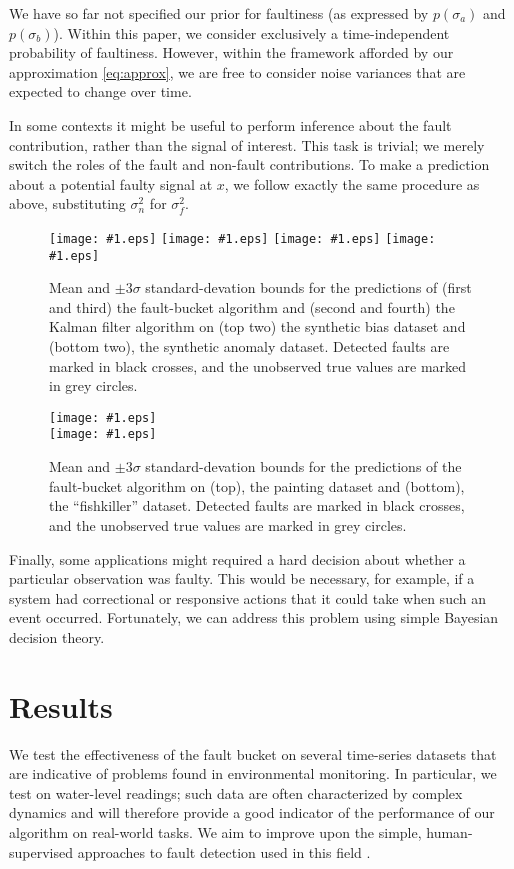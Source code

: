 \documentclass{article}
\newcommand{\psff}[1]{\texttt{[image: \#1.eps]}}
\begin{document}
We have so far not specified our prior for faultiness (as expressed by
$p(\sigma_a)$ and $p(\sigma_b)$). Within this paper, we consider
exclusively a time-independent probability of faultiness. However,
within the framework afforded by our approximation \eqref{eq:approx},
we are free to consider noise variances that are expected to change
over time.

In some contexts it might be useful to perform inference about the
fault contribution, rather than the signal of interest.  This task is
trivial; we merely switch the roles of the fault and non-fault
contributions.  To make a prediction about a potential faulty signal
at $x$, we follow exactly the same procedure as above, substituting
$\sigma_n^2$ for $\sigma_f^2$.

\begin{figure*}
  \centering
  \small
  \psff{bias}
  \psff{kf_bias}
  \vspace*{2\baselineskip}
  \psff{dynamics}
  \psff{kf_dynamics}
  \caption{Mean and $\pm3\sigma$ standard-devation bounds for the
    predictions of (first and third) the fault-bucket algorithm and
    (second and fourth) the Kalman filter algorithm on (top two) the
    synthetic bias dataset and (bottom two), the synthetic anomaly
    dataset.  Detected faults are marked in black crosses, and the
    unobserved true values are marked in grey circles.}
  \label{compare}
\end{figure*}

\begin{figure*}
  \centering
  \small
  \psff{painting} \\
  \vspace{\baselineskip}
  \psff{fishkiller}
  \caption{Mean and $\pm3\sigma$ standard-devation bounds for the
    predictions of the fault-bucket algorithm on (top), the painting
    dataset and (bottom), the ``fishkiller'' dataset.  Detected faults are
    marked in black crosses, and the unobserved true values are marked
    in grey circles.}
  \label{justfb}
\end{figure*}

Finally, some applications might required a hard decision about
whether a particular observation was faulty.  This would be necessary,
for example, if a system had correctional or responsive actions that
it could take when such an event occurred.  Fortunately, we can
address this problem using simple Bayesian decision theory.

\section{Results}
We test the effectiveness of the fault bucket on several time-series
datasets that are indicative of problems found in environmental
monitoring. In particular, we test on water-level readings; such data
are often characterized by complex dynamics and will therefore provide
a good indicator of the performance of our algorithm on real-world
tasks. We aim to improve upon the simple, human-supervised approaches
to fault detection used in this field
\citep{wagner2006guidelines}. 
\end{document}
